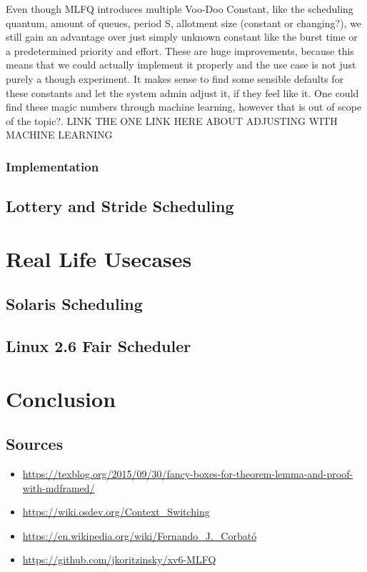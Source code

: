 \documentclass{report}
\begin{document}
Even though MLFQ introduces multiple Voo-Doo Constant, like the scheduling quantum, amount of queues, period S, allotment size (constant or changing?), we still gain an advantage over just simply unknown constant like the burst time or a predetermined priority and effort. These are huge improvements, because this means that we could actually implement it properly and the use case is not just purely a though experiment. 
It makes sense to find some sensible defaults for these constants and let the system admin adjust it, if they feel like it. One could find these magic numbers through machine learning, however that is out of scope of the topic?.
LINK THE ONE LINK HERE ABOUT ADJUSTING WITH MACHINE LEARNING

\section{Implementation}

\chapter{Lottery and Stride Scheduling}

\part{Real Life Usecases}

\chapter{Solaris Scheduling}

\chapter{Linux 2.6 Fair Scheduler}



\part{Conclusion}

\chapter*{Sources}

\begin{itemize}
    \item \url{https://texblog.org/2015/09/30/fancy-boxes-for-theorem-lemma-and-proof-with-mdframed/}
    \item \url{https://wiki.osdev.org/Context_Switching}
    \item \url{https://en.wikipedia.org/wiki/Fernando_J._Corbató}
    \item \url{https://github.com/jkoritzinsky/xv6-MLFQ}
\end{itemize}
\end{document}
